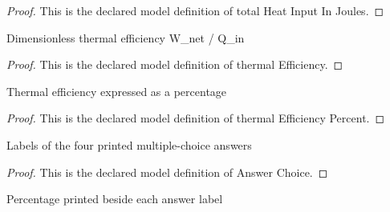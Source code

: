 \begin{proof}
  This is the declared model definition of total Heat Input In Joules.
\end{proof}
\begin{definition}
  \label{def:physics:phyx-mini-0354:phyxminiproblems-problemphyxmini0354-thermalefficiency}
  Dimensionless thermal efficiency W\_net / Q\_in
\end{definition}
\begin{proof}
  This is the declared model definition of thermal Efficiency.
\end{proof}
\begin{definition}
  \label{def:physics:phyx-mini-0354:phyxminiproblems-problemphyxmini0354-thermalefficiencypercent}
  Thermal efficiency expressed as a percentage
\end{definition}
\begin{proof}
  This is the declared model definition of thermal Efficiency Percent.
\end{proof}
\begin{definition}
  \label{def:physics:phyx-mini-0354:phyxminiproblems-problemphyxmini0354-answerchoice}
  Labels of the four printed multiple-choice answers
\end{definition}
\begin{proof}
  This is the declared model definition of Answer Choice.
\end{proof}
\begin{definition}
  \label{def:physics:phyx-mini-0354:phyxminiproblems-problemphyxmini0354-displayedefficiencypercent}
  Percentage printed beside each answer label
\end{definition}
